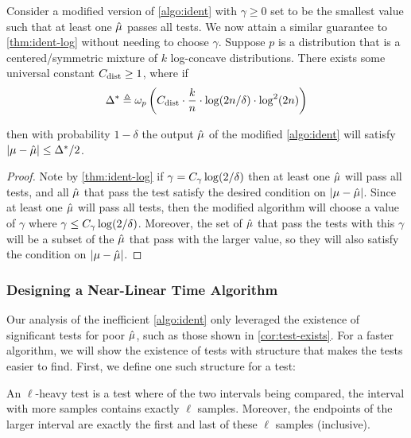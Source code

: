\begin{corollary}\label{cor:paramfree-ident-log}
    Consider a modified version of \cref{algo:ident} with $\gamma \ge 0$ set to be the smallest value such that at least one $\hat{\mu}$ passes all tests. We now attain a similar guarantee to \cref{thm:ident-log} without needing to choose $\gamma$. Suppose $p$ is a distribution that is a centered/symmetric mixture of $k$ log-concave distributions. There exists some universal constant $C_{\operatorname{dist}} \ge 1$, where if
    \begin{equation*}
        \Delta^* \triangleq \omega_p \left( C_{\operatorname{dist}} \cdot \frac{k}{n} \cdot \log(2n/\delta) \cdot \log^2(2n)\right)
    \end{equation*}

    then with probability $1-\delta$ the output $\hat{\mu}$ of the modified \cref{algo:ident} will satisfy $|\mu - \hat{\mu}| \le \Delta^*/2$.  
\end{corollary}
\begin{proof}
    Note by \cref{thm:ident-log} if $\gamma = C_{\gamma} \log(2/\delta)$ then at least one $\hat{\mu}$ will pass all tests, and all $\hat{\mu}$ that pass the test satisfy the desired condition on $|\mu-\hat{\mu}|$. Since at least one $\hat{\mu}$ will pass all tests, then the modified algorithm will choose a value of $\gamma$ where $\gamma \le C_{\gamma} \log(2/\delta)$. Moreover, the set of $\hat{\mu}$ that pass the tests with this $\gamma$ will be a subset of the $\hat{\mu}$ that pass with the larger value, so they will also satisfy the condition on $|\mu - \hat{\mu}|$.
\end{proof}

\subsubsection{Designing a Near-Linear Time Algorithm}\label{sec:fast}
Our analysis of the inefficient \cref{algo:ident} only leveraged the existence of significant tests for poor $\hat{\mu}$, such as those shown in \cref{cor:test-exists}. For a faster algorithm, we will show the existence of tests with structure that makes the tests easier to find. First, we define one such structure for a test:

\begin{definition}
    An $\ell$-heavy test is a test where of the two intervals being compared, the interval with more samples contains exactly $\ell$ samples. Moreover, the endpoints of the larger interval are exactly the first and last of these $\ell$ samples (inclusive).
\end{definition}

